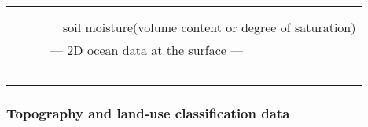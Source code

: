 \begin{table}[tb]
\begin{center}
\begin{tabularx}{150mm}{llX}
    & &  \multicolumn{1}{l}{\color{blue}{surface skin temperature}}\\
    & &  \multicolumn{1}{l}{{\color{blue}{information of depth of soil data in the parent model, soil temperature,}}}\\
    & &  \multicolumn{1}{l}{{{soil moisture(volume content or degree of saturation)}}}\\
    &  \multicolumn{2}{l}{--- 2D ocean data at the surface ---}\\
　　& &  \multicolumn{1}{l}{\color{blue}{sea surface temperature (omitted if skin temperature is also used for SST)}}\\ \hline
  \end{tabularx}
\end{center}
\end{table}


\subsubsection{Topography and land-use classification data}

